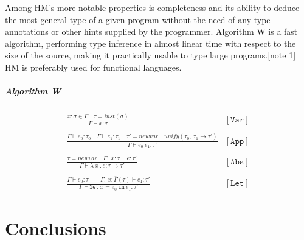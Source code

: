 \documentclass[12pt,b5paper]{book}
\theoremstyle{definition}
\begin{document}
Among HM's more notable properties is completeness and its ability to deduce the most general type of a given program without the need of any type annotations or other hints supplied by the programmer. Algorithm W is a fast algorithm, performing type inference in almost linear time with respect to the size of the source, making it practically usable to type large programs.[note 1] HM is preferably used for functional languages.

\paragraph{Algorithm W}

$$\begin{array}{cl} \displaystyle\frac{x:\sigma \in \Gamma \quad \tau = \mathit{inst}(\sigma)}{\Gamma \vdash x:\tau}&[\mathtt{Var}]\\ \\ \displaystyle\frac{\Gamma \vdash e_0:\tau_0 \quad \Gamma \vdash e_1 : \tau_1 \quad \tau'=\mathit{newvar} \quad \mathit{unify}(\tau_0,\ \tau_1 \rightarrow \tau') }{\Gamma \vdash e_0\ e_1 : \tau'}&[\mathtt{App}]\\ \\ \displaystyle\frac{\tau = \mathit{newvar} \quad \Gamma,\;x:\tau\vdash e:\tau'}{\Gamma \vdash \lambda\ x\ .\ e : \tau \rightarrow \tau'}&[\mathtt{Abs}]\\ \\ \displaystyle\frac{\Gamma \vdash e_0:\tau \quad\quad \Gamma,\,x:\bar{\Gamma}(\tau) \vdash e_1:\tau'}{\Gamma \vdash \mathtt{let}\ x = e_0\ \mathtt{in}\ e_1 : \tau'}&[\mathtt{Let}] \end{array}$$


\chapter{Conclusions}
%
\end{document}
